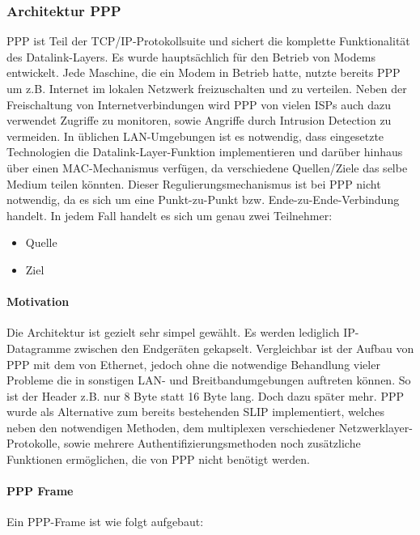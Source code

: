\subsubsection{Architektur PPP}\label{subsubsection:architecture_ppp}
\ac{PPP} ist Teil der TCP/IP-Protokollsuite und sichert die komplette Funktionalität des
Datalink-Layers. Es wurde hauptsächlich für den Betrieb von Modems entwickelt. %
Jede Maschine, die ein Modem in Betrieb hatte, nutzte bereits \ac{PPP} um z.B.
Internet im lokalen Netzwerk freizuschalten und zu verteilen.
Neben der Freischaltung von Internetverbindungen wird \ac{PPP} von vielen \acp{ISP}
auch dazu verwendet Zugriffe zu monitoren, sowie Angriffe durch Intrusion Detection zu vermeiden.
In üblichen \ac{LAN}-Umgebungen ist es notwendig, dass eingesetzte Technologien die Datalink-Layer-Funktion
implementieren und darüber hinhaus über einen MAC-Mechanismus verfügen, da verschiedene
Quellen/Ziele das selbe Medium teilen könnten. Dieser Regulierungsmechanismus ist bei \ac{PPP}
nicht notwendig, da es sich um eine Punkt-zu-Punkt bzw. Ende-zu-Ende-Verbindung handelt.
In jedem Fall handelt es sich um genau zwei Teilnehmer:
\begin{itemize}
	\item Quelle
	\item Ziel
\end{itemize}


\paragraph{Motivation} Die Architektur ist gezielt sehr simpel gewählt. Es werden lediglich IP-Datagramme zwischen den
Endgeräten gekapselt. Vergleichbar ist der Aufbau von PPP mit dem von Ethernet, jedoch ohne
die notwendige Behandlung vieler Probleme die in sonstigen \ac{LAN}- und Breitbandumgebungen
auftreten können. So ist der Header z.B. nur 8 Byte statt 16 Byte lang. Doch dazu später mehr.
\ac{PPP} wurde als Alternative zum bereits bestehenden \ac{SLIP} implementiert, welches neben den notwendigen
Methoden, dem multiplexen verschiedener Netzwerklayer-Protokolle, sowie mehrere Authentifizierungsmethoden noch zusätzliche Funktionen ermöglichen, die von PPP nicht benötigt werden.

\paragraph{PPP Frame}
Ein \ac{PPP}-Frame ist wie folgt aufgebaut:


